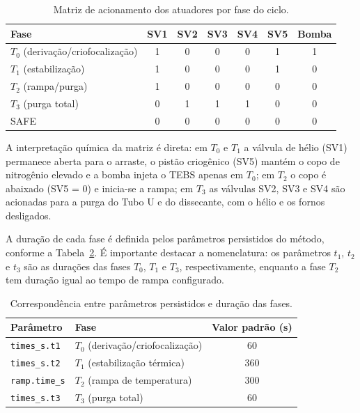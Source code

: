 \begin{table}[htbp]
\centering
\caption{Matriz de acionamento dos atuadores por fase do ciclo.}
\label{tab:matriz}
\begin{tabular}{lcccccc}
\toprule
\textbf{Fase} & \textbf{SV1} & \textbf{SV2} & \textbf{SV3} & \textbf{SV4} & \textbf{SV5} & \textbf{Bomba} \\
\midrule
$T_0$ (deriva\c{c}\~ao/criofocaliza\c{c}\~ao) & 1 & 0 & 0 & 0 & 1 & 1 \\
$T_1$ (estabiliza\c{c}\~ao) & 1 & 0 & 0 & 0 & 1 & 0 \\
$T_2$ (rampa/purga) & 1 & 0 & 0 & 0 & 0 & 0 \\
$T_3$ (purga total) & 0 & 1 & 1 & 1 & 0 & 0 \\
SAFE & 0 & 0 & 0 & 0 & 0 & 0 \\
\bottomrule
\end{tabular}
\par{}
\end{table}

A interpreta\c{c}\~ao qu\'imica da matriz \'e direta: em $T_0$ e $T_1$ a
v\'alvula de h\'elio (SV1) permanece aberta para o arraste, o pist\~ao
criog\^enico (SV5) mant\'em o copo de nitrog\^enio elevado e a bomba injeta o
TEBS apenas em $T_0$; em $T_2$ o copo \'e abaixado (SV5 = 0) e inicia-se a rampa;
em $T_3$ as v\'alvulas SV2, SV3 e SV4 s\~ao acionadas para a purga do Tubo U e do
dissecante, com o h\'elio e os fornos desligados.

A dura\c{c}\~ao de cada fase \'e definida pelos par\^ametros persistidos do
m\'etodo, conforme a Tabela~\ref{tab:duracoes}. \'E importante destacar a
nomenclatura: os par\^ametros $t_1$, $t_2$ e $t_3$ s\~ao as dura\c{c}\~oes das
fases $T_0$, $T_1$ e $T_3$, respectivamente, enquanto a fase $T_2$ tem dura\c{c}\~ao
igual ao tempo de rampa configurado.

\begin{table}[htbp]
\centering
\caption{Correspond\^encia entre par\^ametros persistidos e dura\c{c}\~ao das fases.}
\label{tab:duracoes}
\begin{tabular}{llc}
\toprule
\textbf{Par\^ametro} & \textbf{Fase} & \textbf{Valor padr\~ao (s)} \\
\midrule
\texttt{times\_s.t1} & $T_0$ (deriva\c{c}\~ao/criofocaliza\c{c}\~ao) & 60 \\
\texttt{times\_s.t2} & $T_1$ (estabiliza\c{c}\~ao t\'ermica) & 360 \\
\texttt{ramp.time\_s} & $T_2$ (rampa de temperatura) & 300 \\
\texttt{times\_s.t3} & $T_3$ (purga total) & 60 \\
\bottomrule
\end{tabular}
\par{}
\end{table}

